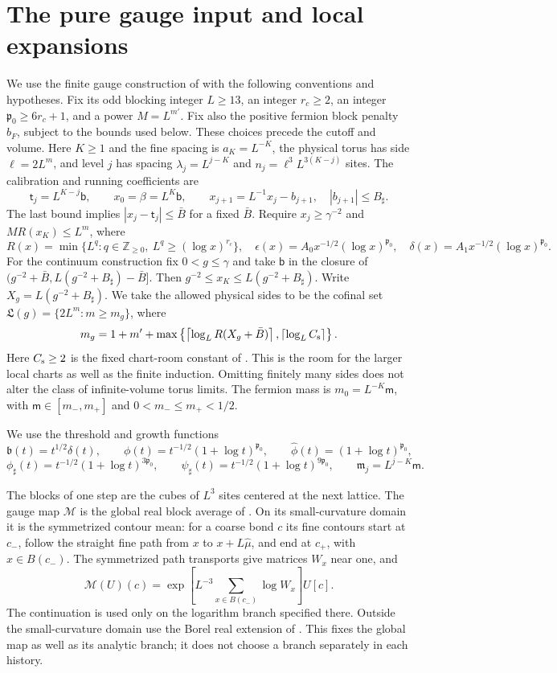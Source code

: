 \documentclass[11pt,letterpaper,reqno]{amsart}
\theoremstyle{definition}
\theoremstyle{remark}
\begin{document}
\section{The pure gauge input and local expansions}

We use the finite gauge construction of \cite{YMM1} with the following
conventions and hypotheses. Fix its odd blocking integer $L\ge13$,
an integer $r_c\ge2$, an integer $\mathfrak p_0\ge6r_c+1$,
and a power $M=L^{m'}$. Fix also the positive fermion block
penalty $b_F$, subject to the bounds used below. These choices
precede the cutoff and volume. Here $K\ge1$ and the fine spacing is $a_K=L^{-K}$,
the physical torus has side $\ell=2L^m$, and level $j$ has spacing
$\lambda_j=L^{j-K}$ and $n_j=\ell^3L^{3(K-j)}$ sites.
The calibration and running coefficients are
\[
 \mathsf t_j=L^{K-j}\mathsf b,\qquad
 x_0=\beta=L^K\mathsf b,\qquad
 x_{j+1}=L^{-1}x_j-b_{j+1},\quad |b_{j+1}|\le B_\sharp.
\]
The last bound implies $|x_j-\mathsf t_j|\le\bar B$ for a
fixed $\bar B$. Require $x_j\ge\gamma^{-2}$ and
$MR(x_K)\le L^m$, where
\[
 R(x)=\min\{L^q:q\in\mathbb Z_{\ge0},\ L^q\ge(\log x)^{r_c}\},\quad
 \epsilon(x)=A_0x^{-1/2}(\log x)^{\mathfrak p_0},\quad
 \delta(x)=A_1x^{-1/2}(\log x)^{\mathfrak p_0}.
\]
For the continuum construction fix $0<g\le\gamma$ and take
$\mathsf b$ in the closure of
$(g^{-2}+\bar B,L(g^{-2}+B_\sharp)-\bar B]$.
Then $g^{-2}\le x_K\le L(g^{-2}+B_\sharp)$.
Write $X_g=L(g^{-2}+B_\sharp)$. We take the allowed physical
sides to be the cofinal set $\mathfrak L(g)=\{2L^m:m\ge m_g\}$, where
\[
 m_g=1+m'+\max\left\{
 \left\lceil\log_L R(X_g+\bar B)\right\rceil,
 \left\lceil\log_L C_{\rm s}\right\rceil\right\}.
\]
Here $C_{\rm s}\ge2$ is the fixed chart-room constant of
\cite[Corollary~69.4 and its preceding torus-room calculation]{YMM1}.
This is the room for the larger local charts as well as the
finite induction. Omitting finitely many sides does not alter
the class of infinite-volume torus limits.
The fermion mass is $m_0=L^{-K}\mathsf m$, with
$\mathsf m\in[m_-,m_+]$ and $0<m_-\le m_+<1/2$.

We use the threshold and growth functions
\[
 \mathfrak b(t)=t^{1/2}\delta(t),\qquad
 \phi(t)=t^{-1/2}(1+\log t)^{\mathfrak p_0},\qquad
 \widehat\phi(t)=(1+\log t)^{\mathfrak p_0},
\]
\[
 \phi_\sharp(t)=t^{-1/2}(1+\log t)^{3\mathfrak p_0},\qquad
 \psi_\sharp(t)=t^{-1/2}(1+\log t)^{9\mathfrak p_0},\qquad
 \mathfrak m_j=L^{j-K}\mathsf m.
\]

The blocks of one step are the cubes of $L^3$ sites centered
at the next lattice. The gauge map $\mathcal M$ is the global
real block average of \cite[Equations~(37)--(38)]{YMM1}.
On its small-curvature domain it is the symmetrized contour
mean: for a coarse bond $c$ its fine contours start at $c_-$,
follow the straight fine path from $x$ to $x+L\hat\mu$, and end at
$c_+$, with $x\in B(c_-)$. The symmetrized path transports
give matrices $W_x$ near one, and
\[
 \mathcal M(U)(c)=
 \exp\left[L^{-3}\sum_{x\in B(c_-)}\log W_x\right]U[c].
\]
The continuation is used only on the logarithm branch specified
there. Outside the small-curvature domain use the Borel real
extension of \cite[Proposition~4.5 and its preceding definition]{YMM1}.
This fixes the global map as well as its analytic branch;
it does not choose a branch separately in each history.
\end{document}
